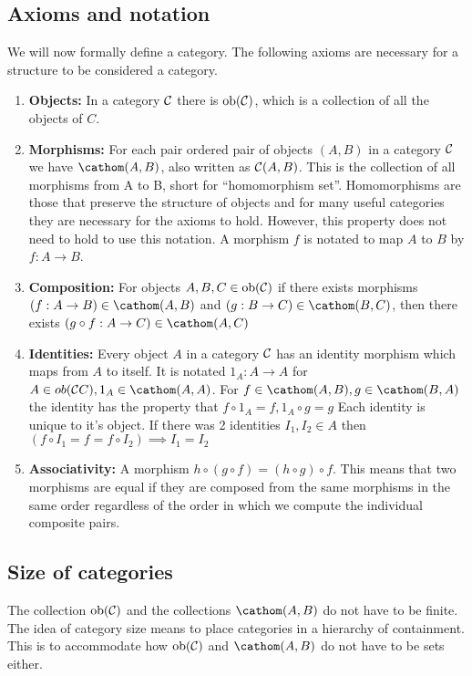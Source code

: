 \documentclass[10pt,a4paper,reqno]{amsart}
\numberwithin{figure}{section}
\begin{document}
\subsection{Axioms and notation}
We will now formally define a category. The following axioms are necessary for a
structure to be considered a category.
\begin{enumerate}
        \item \textbf{Objects:} In a category $\mathcal{C}$ there is $\operatorname{ob}(\mathcal{C})$, which is a
        collection of all the objects of $C$.

        \item \textbf{Morphisms:} For each pair ordered pair of objects $(A,B)$
        in a category $\mathcal{C}$ we have $\cathom(A,B)$, also written as $\mathcal{C}(A,B)$.  This is
        the collection of all morphisms from A to B, short for ``homomorphism
        set''.  Homomorphisms are those that preserve the structure of objects
        and for many useful categories they are necessary for the axioms to
        hold.  However, this property does not need to hold to use this
        notation.  A morphism $f$ is notated to map $A$ to $B$ by $f: A\to B$.

        \item \textbf{Composition:} For objects $A,B,C\in \operatorname{ob}(\mathcal{C})$ if there exists
        morphisms $(f: A\to B)\in \cathom(A,B)$ and $(g: B\to C)\in \cathom(B,C)$, then
        there exists $(g\circ f: A\to C)\in \cathom(A,C)$

        \item \textbf{Identities:} Every object $A$ in a category $\mathcal{C}$ has an
        identity morphism which maps from $A$ to itself.  It is notated $1_A:
        A\to A$ for $A\in ob(\arbcat{C}C), 1_A\in \cathom(A,A)$.  For $f\in \cathom(A,B), g\in
        \cathom(B,A)$ the identity has the property that $f\circ 1_A = f, 1_A\circ g
        = g$ Each identity is unique to it's object. If there was 2 identities
        $I_1,I_2\in A$ then $(f\circ I_1 = f = f\circ I_2) \implies I_1=I_2$

        \item \textbf{Associativity:} A morphism $h\circ(g\circ f) = (h\circ
        g)\circ f$.  This means that two morphisms are equal if they are
        composed from the same morphisms in the same order regardless of the
        order in which we compute the individual composite pairs.
\end{enumerate}

\subsection{Size of categories}
The collection $\operatorname{ob}(\mathcal{C})$ and the collections $\cathom(A,B)$ do not have to be finite.
The idea of category size means to place categories in a hierarchy of
containment. This is to accommodate how $\operatorname{ob}(\mathcal{C})$ and $\cathom(A,B)$ do not have to be
sets either.
\end{document}
